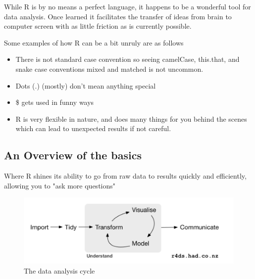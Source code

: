 While R is by no means a perfect language, it happens to be a wonderful tool for data analysis. Once learned it facilitates the transfer of ideas from brain to computer screen with as little friction as is currently possible.

\begin{flushleft}
Some examples of how R can be a bit unruly are as follows
\end{flushleft}

\begin{itemize}
    \item There is not standard case convention so seeing camelCase, this.that, and snake case conventions mixed and matched is not uncommon.
    \item Dots (.) (mostly) don’t mean anything special
    \item \$ gets used in funny ways
    \item R is very flexible in nature, and does many things for you behind the scenes which can lead to unexpected results if not careful. 
\end{itemize}

\subsection{An Overview of the basics}

\begin{flushleft}
Where R shines its ability to go from raw data to results quickly and efficiently, allowing you to "ask more questions"
\end{flushleft}

\begin{figure}[h]
    \centering
    \includegraphics[width=.6\textwidth]{figures/data_analysis_cycle.png}
    \caption{The data analysis cycle}
    \label{fig:data_analysis_cycle}
\end{figure}

